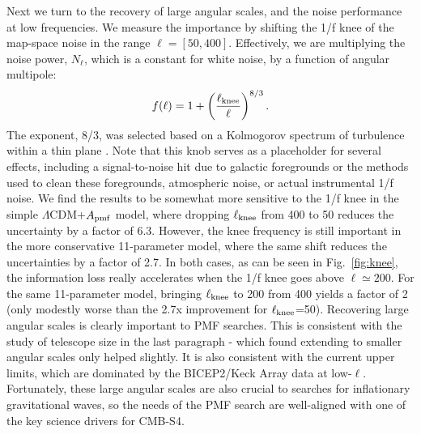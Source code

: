 \documentclass[preprint]{emulateapj}
\newcommand{\apmf}{\ensuremath{A_{\rm pmf}}}
\newcommand{\lcdm}{\ensuremath{\Lambda}CDM}
\newcommand{\lknee}{\ensuremath{\ell_{\rm knee}}}
\newcommand{\be}{\begin{equation}}
\newcommand{\ee}{\end{equation}}
\begin{document}
Next we turn to the recovery of large angular scales, and the noise performance at low frequencies. 
We measure the importance by shifting the 1/f knee of the map-space noise in the range $\ell = [50,400]$. 
Effectively, we are multiplying the noise power, $N_\ell$, which is a constant for white noise,  by a function of angular multipole:
\be \label{eqn:knee}
f(\ell) = 1 + \left(\frac{\ell_{\rm knee}}{\ell}\right)^{8/3}.
\ee 
The exponent, 8/3, was selected based on a Kolmogorov spectrum of turbulence within a thin plane \citep{lay00}. %
Note that this knob  serves as a placeholder for several effects, including a signal-to-noise hit due to galactic foregrounds or the methods used to clean these foregrounds, atmospheric noise, or actual instrumental 1/f noise. 
We find the results to be somewhat more sensitive to the 1/f knee in the simple \lcdm{}+\apmf{} model, where dropping \lknee{} from 400 to 50 reduces the uncertainty by a factor of 6.3.
However, the knee frequency is still important in the more conservative 11-parameter model, where the same shift reduces the uncertainties by a factor of 2.7. 
In both cases, as can be seen in Fig.~\ref{fig:knee}, the information loss really accelerates when the 1/f knee goes above $\ell \simeq 200$. 
For the same 11-parameter model, bringing \lknee{} to 200 from 400 yields a factor of 2 (only modestly worse than the 2.7x improvement for \lknee=50). 
Recovering large angular scales is clearly important to PMF searches. 
This is consistent with the study of telescope size in the last paragraph - which found extending to smaller angular scales only helped slightly. 
It is also consistent with the current upper limits, which are dominated by the BICEP2/Keck Array data at low-$\ell$. 
Fortunately, these large angular scales are also crucial to searches for inflationary gravitational waves, so the needs of the PMF search are well-aligned with one of the key science drivers for CMB-S4.
\end{document}
